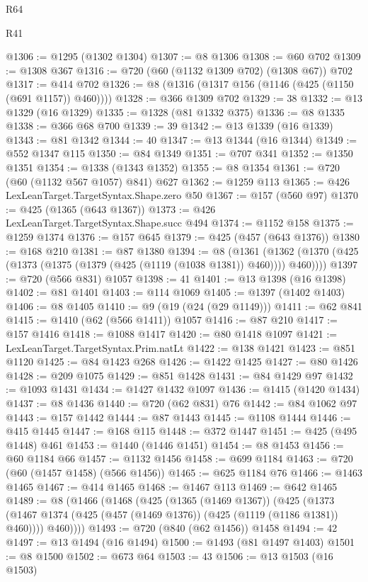 \begin{lexlean}{R64}
\begin{lexlean}{R41}
\begin{coremodule}
{{{{{{{{{{{{{{{{{{{{{{{{{{{{{{{{{{{{{{{{{{{{{{{{{{{{{{{{{{{{{{{{{{{{{{{{{{{{{{{{{{{{{{{{{@1306 := @1295 (@1302 @1304)
@1307 := @8 @1306
@1308 := @60 @702
@1309 := @1308 @367
@1316 := @720 (@60 (@1132 @1309 @702) (@1308 @67)) @702
@1317 := @414 @702
@1326 := @8 (@1316 (@1317 @156 (@1146 (@425 (@1150 (@691 @1157)) @460))))
@1328 := @366 @1309 @702
@1329 := 38
@1332 := @13 @1329 (@16 @1329)
@1335 := @1328 (@81 @1332 @375)
@1336 := @8 @1335
@1338 := @366 @68 @700
@1339 := 39
@1342 := @13 @1339 (@16 @1339)
@1343 := @81 @1342
@1344 := 40
@1347 := @13 @1344 (@16 @1344)
@1349 := @552 @1347 @115
@1350 := @84 @1349
@1351 := @707 @341
@1352 := @1350 @1351
@1354 := @1338 (@1343 @1352)
@1355 := @8 @1354
@1361 := @720 (@60 (@1132 @567 @1057) @841) @627
@1362 := @1259 @113
@1365 := @426 LexLeanTarget.TargetSyntax.Shape.zero @50
@1367 := @157 (@560 @97)
@1370 := @425 (@1365 (@643 @1367))
@1373 := @426 LexLeanTarget.TargetSyntax.Shape.succ @494
@1374 := @1152 @158
@1375 := @1259 @1374
@1376 := @157 @645
@1379 := @425 (@457 (@643 @1376))
@1380 := @168 @210
@1381 := @87 @1380
@1394 := @8
    (@1361 (@1362 (@1370 (@425 (@1373 (@1375 (@1379 (@425 (@1119 (@1038 @1381)) @460)))) @460))))
@1397 := @720 (@566 @831) @1057
@1398 := 41
@1401 := @13 @1398 (@16 @1398)
@1402 := @81 @1401
@1403 := @114 @1069
@1405 := @1397 (@1402 @1403)
@1406 := @8 @1405
@1410 := @9 (@19 (@24 (@29 @1149)))
@1411 := @62 @841
@1415 := @1410 (@62 (@566 @1411)) @1057
@1416 := @87 @210
@1417 := @157 @1416
@1418 := @1088 @1417
@1420 := @80 @1418 @1097
@1421 := LexLeanTarget.TargetSyntax.Prim.natLt
@1422 := @138 @1421
@1423 := @851 @1120
@1425 := @84 @1423 @268
@1426 := @1422 @1425
@1427 := @80 @1426
@1428 := @209 @1075
@1429 := @851 @1428
@1431 := @84 @1429 @97
@1432 := @1093 @1431
@1434 := @1427 @1432 @1097
@1436 := @1415 (@1420 @1434)
@1437 := @8 @1436
@1440 := @720 (@62 @831) @76
@1442 := @84 @1062 @97
@1443 := @157 @1442
@1444 := @87 @1443
@1445 := @1108 @1444
@1446 := @415 @1445
@1447 := @168 @115
@1448 := @372 @1447
@1451 := @425 (@495 @1448) @461
@1453 := @1440 (@1446 @1451)
@1454 := @8 @1453
@1456 := @60 @1184 @66
@1457 := @1132 @1456
@1458 := @699 @1184
@1463 := @720 (@60 (@1457 @1458) (@566 @1456))
@1465 := @625 @1184 @76
@1466 := @1463 @1465
@1467 := @414 @1465
@1468 := @1467 @113
@1469 := @642 @1465
@1489 := @8
    (@1466
      (@1468
        (@425
          (@1365 (@1469 @1367))
          (@425
            (@1373 (@1467 @1374 (@425 (@457 (@1469 @1376)) (@425 (@1119 (@1186 @1381)) @460))))
            @460))))
@1493 := @720 (@840 (@62 @1456)) @1458
@1494 := 42
@1497 := @13 @1494 (@16 @1494)
@1500 := @1493 (@81 @1497 @1403)
@1501 := @8 @1500
@1502 := @673 @64
@1503 := 43
@1506 := @13 @1503 (@16 @1503)
}}}}}}}}}}}}}}}}}}}}}}}}}}}}}}}}}}}}}}}}}}}}}}}}}}}}}}}}}}}}}}}}}}}}}}}}}}}}}}}}}}}}}}}}}
\end{coremodule}
\end{lexlean}
\end{lexlean}
